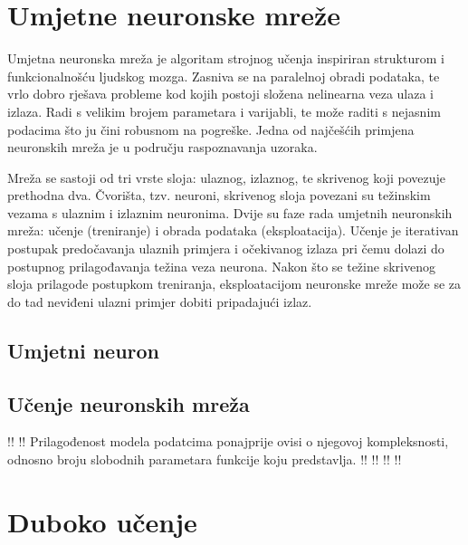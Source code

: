 \documentclass[lmodern, utf8, diplomski, numeric]{fer}
\begin{document}
  

\chapter{Umjetne neuronske mreže}

Umjetna neuronska mreža je algoritam strojnog učenja inspiriran strukturom i funkcionalnošću ljudskog mozga. Zasniva se na paralelnoj obradi podataka, te vrlo dobro rješava probleme kod kojih postoji složena nelinearna veza ulaza i izlaza. Radi s velikim brojem parametara i varijabli, te može raditi s nejasnim podacima što ju čini robusnom na pogreške. Jedna od najčešćih primjena neuronskih mreža je u području raspoznavanja uzoraka.

Mreža se sastoji od tri vrste sloja: ulaznog, izlaznog, te skrivenog koji povezuje prethodna dva. Čvorišta, tzv. neuroni, skrivenog sloja povezani su težinskim vezama s ulaznim i izlaznim neuronima. Dvije su faze rada umjetnih neuronskih mreža: učenje (treniranje) i obrada podataka (eksploatacija). Učenje je iterativan postupak predočavanja ulaznih primjera i očekivanog izlaza pri čemu dolazi do postupnog prilagođavanja težina veza neurona. Nakon što se težine skrivenog sloja prilagode postupkom treniranja, eksploatacijom neuronske mreže može se za do tad neviđeni ulazni primjer dobiti pripadajući izlaz.

\section{Umjetni neuron}
\section{Učenje neuronskih mreža}

!!
!!
Prilagođenost modela podatcima ponajprije ovisi o njegovoj kompleksnosti, odnosno broju slobodnih parametara funkcije koju predstavlja.
!!
!!
!!
!!


\chapter{Duboko učenje}
\end{document}

